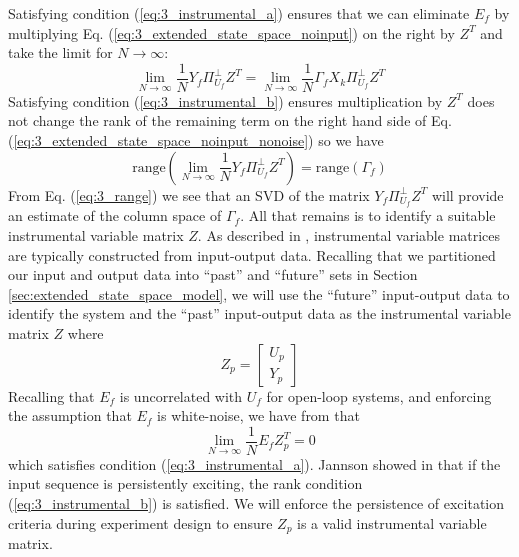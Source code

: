 Satisfying condition (\ref{eq:3_instrumental_a}) ensures that we can eliminate $E_f$ by multiplying Eq. (\ref{eq:3_extended_state_space_noinput}) on the right by $Z^T$ and take the limit for $N\rightarrow\infty$:
\begin{equation}\label{eq:3_extended_state_space_noinput_nonoise}
\lim_{N\rightarrow\infty} \frac{1}{N}Y_f\Pi_{U_f}^\perp Z^T = \lim_{N\rightarrow\infty} \frac{1}{N}\Gamma_f X_k\Pi_{U_f}^\perp Z^T
\end{equation}
 Satisfying condition (\ref{eq:3_instrumental_b}) ensures multiplication by $Z^T$ does not change the rank of the remaining term on the right hand side of Eq. (\ref{eq:3_extended_state_space_noinput_nonoise}) so we have
\begin{equation}\label{eq:3_range}
\mbox{range}\left(\lim_{N\rightarrow\infty} \frac{1}{N} Y_f\Pi_{U_f}^\perp Z^T\right) = \mbox{range}\left(\Gamma_f\right)
\end{equation}
From Eq. (\ref{eq:3_range}) we see that an SVD of the matrix $Y_f\Pi_{U_f}^\perp Z^T$  will provide an estimate of the column space of $\Gamma_f$. All that remains is to identify a suitable instrumental variable matrix $Z$. As described in \cite{soderstrom1983instrumental, verhaegen2007filtering}, instrumental variable matrices are typically constructed from input-output data. Recalling that we partitioned our input and output data into ``past'' and ``future'' sets in Section \ref{sec:extended_state_space_model}, we will use the ``future'' input-output data to identify the system and the ``past'' input-output data as the instrumental variable matrix $Z$ where
\begin{equation*}
Z_p = \begin{bmatrix}U_p\\ Y_p\end{bmatrix}
\end{equation*}
Recalling that $E_f$ is uncorrelated with $U_f$ for open-loop systems, and enforcing the assumption that $E_f$ is white-noise, we have from \cite{verhaegen2007filtering} that 
\begin{equation*}
\lim_{N\rightarrow\infty} \frac{1}{N} E_f Z_p^T = 0
\end{equation*}
which satisfies condition (\ref{eq:3_instrumental_a}). Jannson showed in \cite{jansson1997subspace} that if the input sequence is persistently exciting, the rank condition (\ref{eq:3_instrumental_b}) is satisfied. We will enforce the persistence of excitation criteria during experiment design to ensure $Z_p$ is a valid instrumental variable matrix.

